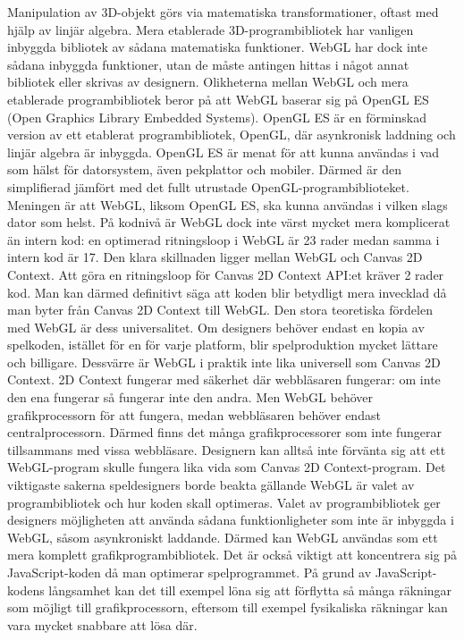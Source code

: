 Manipulation av 3D-objekt görs via matematiska transformationer, oftast med hjälp av linjär algebra. Mera etablerade 3D-programbibliotek har vanligen inbyggda bibliotek av sådana matematiska funktioner. WebGL har dock inte sådana inbyggda funktioner, utan de måste antingen hittas i något annat bibliotek eller skrivas av designern.
Olikheterna mellan WebGL och mera etablerade programbibliotek beror på att WebGL baserar sig på OpenGL ES (Open Graphics Library Embedded Systems). OpenGL ES är en förminskad version av ett etablerat programbibliotek, OpenGL, där asynkronisk laddning och linjär algebra är inbyggda. OpenGL ES är menat för att kunna användas i vad som hälst för datorsystem, även pekplattor och mobiler. Därmed är den simplifierad jämfört med det fullt utrustade OpenGL-programbiblioteket. Meningen är att WebGL, liksom OpenGL ES, ska kunna användas i vilken slags dator som helst.
På kodnivå är WebGL dock inte värst mycket mera komplicerat än intern kod: en optimerad ritningsloop i WebGL är 23 rader medan samma i intern kod är 17. Den klara skillnaden ligger mellan WebGL och Canvas 2D Context. Att göra en ritningsloop för Canvas 2D Context API:et kräver 2 rader kod. Man kan därmed definitivt säga att koden blir betydligt mera invecklad då man byter från Canvas 2D Context till WebGL.
Den stora teoretiska fördelen med WebGL är dess universalitet. Om designers behöver endast en kopia av spelkoden, istället för en för varje platform, blir spelproduktion mycket lättare och billigare. Dessvärre är WebGL i praktik inte lika universell som Canvas 2D Context. 2D Context fungerar med säkerhet där webbläsaren fungerar: om inte den ena fungerar så fungerar inte den andra. Men WebGL behöver grafikprocessorn för att fungera, medan webbläsaren behöver endast centralprocessorn. Därmed finns det många grafikprocessorer som inte fungerar tillsammans med vissa webbläsare. Designern kan alltså inte förvänta sig att ett WebGL-program skulle fungera lika vida som Canvas 2D Context-program. 
Det viktigaste sakerna speldesigners borde beakta gällande WebGL är valet av programbibliotek och hur koden skall optimeras. Valet av programbibliotek ger designers möjligheten att använda sådana funktionligheter som inte är inbyggda i WebGL, såsom asynkroniskt laddande. Därmed kan WebGL användas som ett mera komplett grafikprogrambibliotek. Det är också viktigt att koncentrera sig på JavaScript-koden då man optimerar spelprogrammet. På grund av JavaScript-kodens långsamhet kan det till exempel löna sig att förflytta så många räkningar som möjligt till grafikprocessorn, eftersom till exempel fysikaliska räkningar kan vara mycket snabbare att lösa där.
